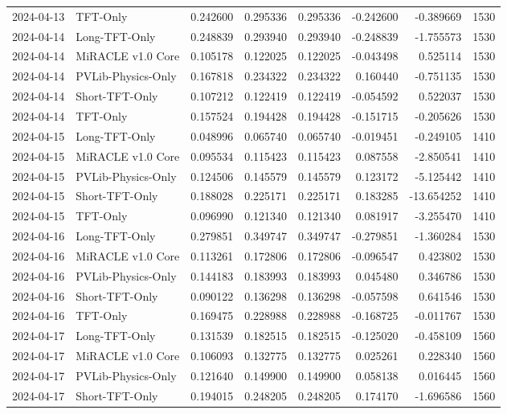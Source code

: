 \begin{tabular}{llrrrrrr}
2024-04-13 & TFT-Only & 0.242600 & 0.295336 & 0.295336 & -0.242600 & -0.389669 & 1530 \\
2024-04-14 & Long-TFT-Only & 0.248839 & 0.293940 & 0.293940 & -0.248839 & -1.755573 & 1530 \\
2024-04-14 & MiRACLE v1.0 Core & 0.105178 & 0.122025 & 0.122025 & -0.043498 & 0.525114 & 1530 \\
2024-04-14 & PVLib-Physics-Only & 0.167818 & 0.234322 & 0.234322 & 0.160440 & -0.751135 & 1530 \\
2024-04-14 & Short-TFT-Only & 0.107212 & 0.122419 & 0.122419 & -0.054592 & 0.522037 & 1530 \\
2024-04-14 & TFT-Only & 0.157524 & 0.194428 & 0.194428 & -0.151715 & -0.205626 & 1530 \\
2024-04-15 & Long-TFT-Only & 0.048996 & 0.065740 & 0.065740 & -0.019451 & -0.249105 & 1410 \\
2024-04-15 & MiRACLE v1.0 Core & 0.095534 & 0.115423 & 0.115423 & 0.087558 & -2.850541 & 1410 \\
2024-04-15 & PVLib-Physics-Only & 0.124506 & 0.145579 & 0.145579 & 0.123172 & -5.125442 & 1410 \\
2024-04-15 & Short-TFT-Only & 0.188028 & 0.225171 & 0.225171 & 0.183285 & -13.654252 & 1410 \\
2024-04-15 & TFT-Only & 0.096990 & 0.121340 & 0.121340 & 0.081917 & -3.255470 & 1410 \\
2024-04-16 & Long-TFT-Only & 0.279851 & 0.349747 & 0.349747 & -0.279851 & -1.360284 & 1530 \\
2024-04-16 & MiRACLE v1.0 Core & 0.113261 & 0.172806 & 0.172806 & -0.096547 & 0.423802 & 1530 \\
2024-04-16 & PVLib-Physics-Only & 0.144183 & 0.183993 & 0.183993 & 0.045480 & 0.346786 & 1530 \\
2024-04-16 & Short-TFT-Only & 0.090122 & 0.136298 & 0.136298 & -0.057598 & 0.641546 & 1530 \\
2024-04-16 & TFT-Only & 0.169475 & 0.228988 & 0.228988 & -0.168725 & -0.011767 & 1530 \\
2024-04-17 & Long-TFT-Only & 0.131539 & 0.182515 & 0.182515 & -0.125020 & -0.458109 & 1560 \\
2024-04-17 & MiRACLE v1.0 Core & 0.106093 & 0.132775 & 0.132775 & 0.025261 & 0.228340 & 1560 \\
2024-04-17 & PVLib-Physics-Only & 0.121640 & 0.149900 & 0.149900 & 0.058138 & 0.016445 & 1560 \\
2024-04-17 & Short-TFT-Only & 0.194015 & 0.248205 & 0.248205 & 0.174170 & -1.696586 & 1560 \\

\end{tabular}
